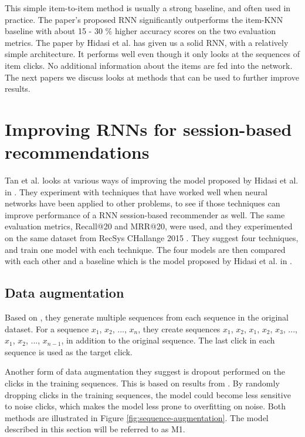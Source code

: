 This simple item-to-item method is usually a strong baseline, and often used in practice. The paper's proposed RNN significantly outperforms the item-KNN baseline with about 15 - 30 \% higher accuracy scores on the two evaluation metrics. The paper by Hidasi et al. has given us a solid RNN, with a relatively simple architecture. It performs well even though it only looks at the sequences of item clicks. No additional information about the items are fed into the network. The next papers we discuss looks at methods that can be used to further improve results.



\section{Improving RNNs for session-based recommendations}
\label{sec:improved-rnn}
Tan et al. \cite{DBLP:journals/corr/TanXL16} looks at various ways of improving the model proposed by Hidasi et al. in \cite{DBLP:journals/corr/HidasiKBT15}. They experiment with techniques that have worked well when neural networks have been applied to other problems, to see if those techniques can improve performance of a RNN session-based recommender as well. The same evaluation metrics, Recall@20 and MRR@20, were used, and they experimented on the same dataset from RecSys CHallange 2015 \cite{dataset:recsys15}. They suggest four techniques, and train one model with each technique. The four models are then compared with each other and a baseline which is the model proposed by Hidasi et al. in \cite{DBLP:journals/corr/HidasiKBT15}.

\subsection{Data augmentation}
Based on \cite{DBLP:journals/corr/BrebissonSAVB15}, they generate multiple sequences from each sequence in the original dataset. For a sequence \lbrack $x_1$, $x_2$, ..., $x_n$\rbrack, they create sequences \lbrack $x_1$, $x_2$\rbrack, \lbrack $x_1$, $x_2$, $x_3$\rbrack, ..., \lbrack $x_1$, $x_2$, ..., $x_{n-1}$\rbrack, in addition to the original sequence. The last click in each sequence is used as the target click.

Another form of data augmentation they suggest is dropout performed on the clicks in the training sequences. This is based on results from \cite{rnn-dropout}. By randomly dropping clicks in the training sequences, the model could become less sensitive to noise clicks, which makes the model less prone to overfitting on noise. Both methods are illustrated in Figure \ref{fig:sequence-augmentation}. The model described in this section will be referred to as M1.


